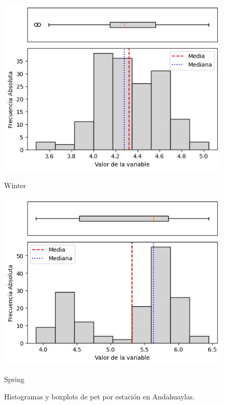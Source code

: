 \begin{figure}[htbp]
\vspace{0.2cm}

\begin{minipage}{0.30\textwidth}
  \includegraphics[width=\linewidth]{resultados/por_estacion_del_anio/boxplot_clases_por_estacion/Andahuaylas/PET_HistBoxplot_Winter.png}
  \caption*{Winter}
\end{minipage}
\hfill
\begin{minipage}{0.30\textwidth}
  \includegraphics[width=\linewidth]{resultados/por_estacion_del_anio/boxplot_clases_por_estacion/Andahuaylas/PET_HistBoxplot_Spring.png}
  \caption*{Spring}
\end{minipage}
\caption{Histogramas y boxplots de \gls{pet}  por estación en Andahuaylas.}
\label{fig:andahuaylas_pet_hist}
\end{figure}

